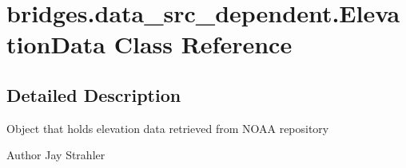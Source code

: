 \hypertarget{classbridges_1_1data__src__dependent_1_1_elevation_data}{}\section{bridges.\+data\+\_\+src\+\_\+dependent.\+Elevation\+Data Class Reference}
\label{classbridges_1_1data__src__dependent_1_1_elevation_data}


\subsection{Detailed Description}
Object that holds elevation data retrieved from N\+O\+AA repository

\begin{DoxyAuthor}{Author}
Jay Strahler 
\end{DoxyAuthor}
